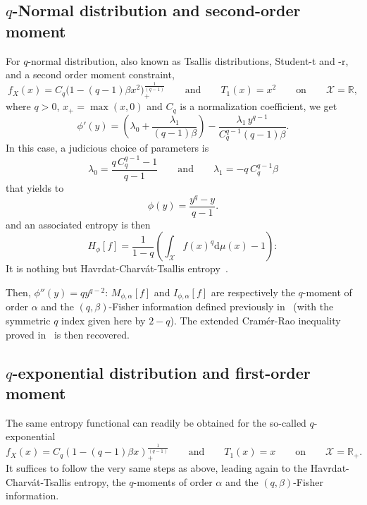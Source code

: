 \documentclass[english,sort&compress]{elsarticle}
\theoremstyle{definition}
\theoremstyle{plain}
\theoremstyle{plain}
\def\dmu{\mathrm{d}\mu}
\def\Rset{\mathbb{R}}
\def\X{\mathcal{X}}
\begin{document}

\subsection{$q$-Normal distribution and second-order moment}
\label{subsec:qNormalSecondOrder}

For $q$-normal distribution, also  known as Tsallis distributions, Student-t and
-r, and a second order moment constraint,
%
\[
f_X(x)  = C_q  \Big( 1  - (q-1)  \beta x^2  \Big)_{\!+}^{\frac{1}{(q-1)}} \qquad
\mbox{and} \qquad T_1(x) = x^2 \qquad \mbox{on} \qquad \X = \Rset,
\]
%
where $q  > 0$, $x_+ = \max(x,0)$  and $C_q$ is a  normalization coefficient, we
get
%
\[
\phi'(y)  =   \left(  \lambda_0   +  \frac{\lambda_1}{(q-1)  \beta}   \right)  -
\frac{\lambda_1 \, y^{q-1}}{C_q^{q-1} (q-1) \beta}.
\]
%
In this case, a judicious choice of parameters is
%
\[
\lambda_0 = \frac{q \, C_q^{q-1}  - 1}{q-1} \qquad \mbox{and} \qquad \lambda_1 =
-q \, C_q^{q-1} \beta
\]
%
that yields to 
%
\[
\phi(y) = \frac{y^q-y}{q-1}.
\]
%
and an associated entropy is then 
%
\[
H_\phi[f] = \frac{1}{1-q} \left( \int_\X f(x)^q \dmu(x) - 1 \right):
\]
%
It  is  nothing  but  Havrdat-Charv\'at-Tsallis  entropy~\cite{HavCha67,  Dar70,
  Tsa88, CosHer03}.

Then, $\phi''(y) = q y^{q-2}$: $M_{\phi,\alpha}[f]$ and $I_{\phi,\alpha}[f]$ are
respectively  the  $q$-moment  of  order  $\alpha$  and  the  $(q,\beta)$-Fisher
information defined previously in~\cite{Ber12:06_1, Ber12:06_2, Ber13} (with the
symmetric $q$ index  given here by $2-q$). The  extended Cram\'er-Rao inequality
proved in~\cite{Ber12:06_2, Ber13} is then recovered.



\subsection{$q$-exponential distribution and first-order moment}
\label{subsec:qExponentialFirstOrder}

The  same  entropy  functional  can   readily  be  obtained  for  the  so-called
$q$-exponential
% 
\[
f_X(x)  =  C_q \left(  1  -  (q-1)  \beta x  \right)_+^{\frac{1}{(q-1)}}  \qquad
\mbox{and} \qquad T_1(x) = x \qquad \mbox{on} \qquad \X = \Rset_+.
\]
%
It  suffices to  follow  the very  same steps  as  above, leading  again to  the
Havrdat-Charv\'at-Tsallis  entropy, the  $q$-moments of  order $\alpha$  and the
$(q,\beta)$-Fisher information.
\end{document}
